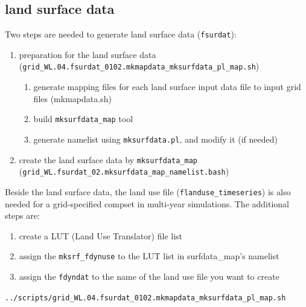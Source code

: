 \documentclass[journal abbreviation, manuscript]{copernicus}
\begin{document}
\subsection{land surface data}
Two steps are needed to generate land surface data (\verb|fsurdat|):
\begin{enumerate}
  \item preparation for the land surface data (\lstinline|grid_WL.04.fsurdat_0102.mkmapdata_mksurfdata_pl_map.sh|)
  	\begin{enumerate}[label*=\arabic*.]
  	\item generate mapping files for each land surface input data file to input grid files (mkmapdata.sh)
  	\item build \verb|mksurfdata_map| tool
  	\item generate namelist using \verb|mksurfdata.pl|, and modify it (if needed)
  	\end{enumerate}
  \item create the land surface data by \verb|mksurfdata_map| (\lstinline|grid_WL.fsurdat_02.mksurfdata_map_namelist.bash|)
  \end{enumerate}
\vspace{\baselineskip}

Beside the land surface data, the land use file (\verb|flanduse_timeseries|) is also needed for a grid-specified compset in multi-year simulations. The additional steps are:
\begin{enumerate}
  \item create a LUT (Land Use Translator) file list
  \item assign the \verb|mksrf_fdynuse| to the LUT list in surfdata\_map's namelist
  \item assign the \verb|fdyndat| to the name of the land use file you want to create
\end{enumerate}
\vspace{\baselineskip}


\lstinline|../scripts/grid_WL.04.fsurdat_0102.mkmapdata_mksurfdata_pl_map.sh|
\end{document}
